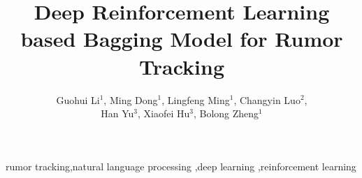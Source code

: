 \documentclass[review]{elsarticle}
\begin{document}
\begin{frontmatter}

\title{Deep Reinforcement Learning based Bagging Model for Rumor Tracking}

\author{Guohui Li$^1$, Ming Dong$^1$, Lingfeng Ming$^1$, Changyin Luo$^2$,\\Han Yu$^3$, Xiaofei Hu$^3$, Bolong Zheng$^1$}
\address{$^1$Huazhong University of Science and Technology, Wuhan, China}
\address{$^2$Central China Normal University, Wuhan, China}
\address{$^3$Wuhan Fiberhome Technical Services Co.,Ltd, Wuhan, China}




\begin{keyword}
rumor tracking\sep natural language processing \sep deep learning \sep reinforcement learning
\end{keyword}

\end{frontmatter}

\linenumbers









\end{document}
